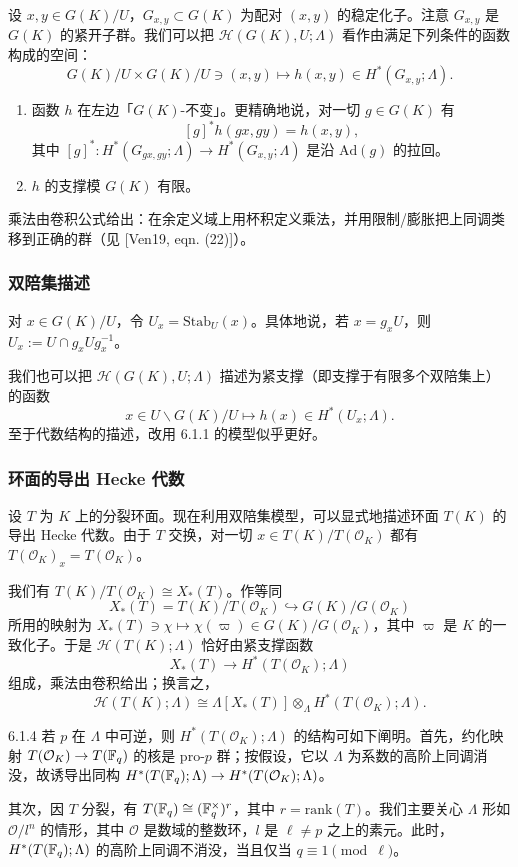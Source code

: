 设 $x,y\in G(K)/U$，$G_{x,y}\subset G(K)$ 为配对 $(x,y)$ 的稳定化子。注意 $G_{x,y}$ 是 $G(K)$ 的紧开子群。我们可以把 $\mathcal H(G(K),U;\Lambda)$ 看作由满足下列条件的函数构成的空间：
\[
G(K)/U\times G(K)/U\ni(x,y)\mapsto h(x,y)\in H^*(G_{x,y};\Lambda).
\]
\begin{enumerate}[(1)]
\item 函数 $h$ 在左边「$G(K)$-不变」。更精确地说，对一切 $g\in G(K)$ 有
\[
[g]^*h(gx,gy)=h(x,y),
\]
其中 $[g]^*\colon H^*(G_{gx,gy};\Lambda)\to H^*(G_{x,y};\Lambda)$ 是沿 $\mathrm{Ad}(g)$ 的拉回。
\item $h$ 的支撑模 $G(K)$ 有限。
\end{enumerate}
乘法由卷积公式给出：在余定义域上用杯积定义乘法，并用限制/膨胀把上同调类移到正确的群（见 [Ven19, eqn. (22)]）。

\subsubsection{双陪集描述}

对 $x\in G(K)/U$，令 $U_x=\mathrm{Stab}_U(x)$。具体地说，若 $x=g_xU$，则 $U_x:=U\cap g_xUg_x^{-1}$。

我们也可以把 $\mathcal H(G(K),U;\Lambda)$ 描述为紧支撑（即支撑于有限多个双陪集上）的函数
\[
x\in U\backslash G(K)/U\mapsto h(x)\in H^*(U_x;\Lambda).
\]
至于代数结构的描述，改用 6.1.1 的模型似乎更好。

\subsubsection{环面的导出 Hecke 代数}

设 $T$ 为 $K$ 上的分裂环面。现在利用双陪集模型，可以显式地描述环面 $T(K)$ 的导出 Hecke 代数。由于 $T$ 交换，对一切 $x\in T(K)/T(\mathcal O_K)$ 都有 $T(\mathcal O_K)_x=T(\mathcal O_K)$。

我们有 $T(K)/T(\mathcal O_K)\cong X_*(T)$。作等同
\begin{equation}\tag{6.1.1}\label{eq:a6-04-5}
X_*(T)=T(K)/T(\mathcal O_K)\hookrightarrow G(K)/G(\mathcal O_K)
\end{equation}
所用的映射为 $X_*(T)\ni\chi\mapsto\chi(\varpi)\in G(K)/G(\mathcal O_K)$，其中 $\varpi$ 是 $K$ 的一致化子。于是 $\mathcal H(T(K);\Lambda)$ 恰好由紧支撑函数
\[
X_*(T)\to H^*(T(\mathcal O_K);\Lambda)
\]
组成，乘法由卷积给出；换言之，
\[
\mathcal H(T(K);\Lambda)\cong\Lambda[X_*(T)]\otimes_\Lambda H^*(T(\mathcal O_K);\Lambda).
\]

\begin{rem}{6.1.4}\label{thm:a6-04-4}
若 $p$ 在 $\Lambda$ 中可逆，则 $H^*(T(\mathcal O_K);\Lambda)$ 的结构可如下阐明。首先，约化映射 $T(\mathcal O_K)\to T(\mathbb{F}_q)$ 的核是 pro-$p$ 群；按假设，它以 $\Lambda$ 为系数的高阶上同调消没，故诱导出同构 $H^*(T(\mathbb{F}_q);\Lambda)\to H^*(T(\mathcal O_K);\Lambda)$。

其次，因 $T$ 分裂，有 $T(\mathbb{F}_q)\cong(\mathbb{F}_q^\times)^r$，其中 $r=\mathrm{rank}(T)$。我们主要关心 $\Lambda$ 形如 $\mathcal O/l^n$ 的情形，其中 $\mathcal O$ 是数域的整数环，$l$ 是 $\ell\ne p$ 之上的素元。此时，$H^*(T(\mathbb{F}_q);\Lambda)$ 的高阶上同调不消没，当且仅当 $q\equiv1\pmod\ell$。
\end{rem}

